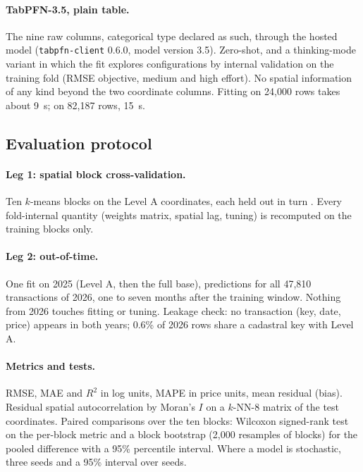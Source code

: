 \documentclass[11pt,a4paper]{article}
\begin{document}
\paragraph{TabPFN-3.5, plain table.} The nine raw columns, categorical type declared as such,
through the hosted model (\texttt{tabpfn-client} 0.6.0, model version 3.5). Zero-shot, and a
thinking-mode variant in which the fit explores configurations by internal validation on the
training fold (RMSE objective, medium and high effort). No spatial information of any kind beyond
the two coordinate columns. Fitting on 24{,}000 rows takes about 9~s; on 82{,}187 rows, 15~s.

\subsection{Evaluation protocol}

\paragraph{Leg 1: spatial block cross-validation.} Ten $k$-means blocks on the Level A coordinates,
each held out in turn \citep{roberts2017,meyer2022}. Every fold-internal quantity (weights matrix,
spatial lag, tuning) is recomputed on the training blocks only.

\paragraph{Leg 2: out-of-time.} One fit on 2025 (Level A, then the full base), predictions for all
47{,}810 transactions of 2026, one to seven months after the training window. Nothing from 2026
touches fitting or tuning. Leakage check: no transaction (key, date, price) appears in both years;
0.6\% of 2026 rows share a cadastral key with Level A.

\paragraph{Metrics and tests.} RMSE, MAE and $R^2$ in log units, MAPE in price units, mean residual
(bias). Residual spatial autocorrelation by Moran's $I$ \citep{moran1950} on a $k$-NN-8 matrix of
the test coordinates. Paired comparisons over the ten blocks: Wilcoxon signed-rank test on the
per-block metric and a block bootstrap (2{,}000 resamples of blocks) for the pooled difference with
a 95\% percentile interval. Where a model is stochastic, three seeds and a 95\% interval over
seeds.
\end{document}

